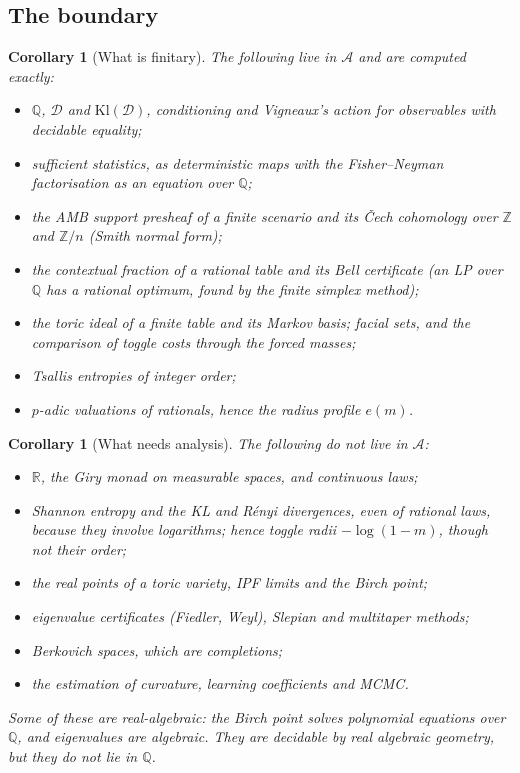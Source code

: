 \documentclass[11pt]{article}
\newtheorem{corollary}[theorem]{Corollary}
\theoremstyle{definition}
\theoremstyle{remark}
\begin{document}
\subsection*{The boundary}
\begin{corollary}[What is finitary]\label{cor:finitary}
The following live in $\mathcal A$ and are computed exactly:
\begin{itemize}
  \item $\mathbb Q$, $\mathcal D$ and $\mathrm{Kl}(\mathcal D)$, conditioning and Vigneaux's action for observables with decidable equality;
  \item sufficient statistics, as deterministic maps with the Fisher--Neyman factorisation as an equation over $\mathbb Q$;
  \item the AMB support presheaf of a finite scenario and its \v{C}ech cohomology over $\mathbb Z$ and $\mathbb Z/n$ (Smith normal form);
  \item the contextual fraction of a \emph{rational} table and its Bell certificate (an LP over $\mathbb Q$ has a rational optimum, found by the finite simplex method);
  \item the toric ideal of a finite table and its Markov basis; facial sets, and the comparison of toggle costs through the forced masses;
  \item Tsallis entropies of integer order;
  \item $p$-adic valuations of rationals, hence the radius profile $e(m)$.
\end{itemize}
\end{corollary}

\begin{corollary}[What needs analysis]\label{cor:analytic}
The following do not live in $\mathcal A$:
\begin{itemize}
  \item $\mathbb R$, the Giry monad on measurable spaces, and continuous laws;
  \item Shannon entropy and the KL and R\'enyi divergences, even of rational laws, because they involve logarithms; hence toggle \emph{radii} $-\log(1-m)$, though not their order;
  \item the real points of a toric variety, IPF limits and the Birch point;
  \item eigenvalue certificates (Fiedler, Weyl), Slepian and multitaper methods;
  \item Berkovich spaces, which are completions;
  \item the estimation of curvature, learning coefficients and MCMC.
\end{itemize}
Some of these are real-algebraic: the Birch point solves polynomial equations over $\mathbb Q$, and eigenvalues are algebraic. They are decidable by real algebraic geometry, but they do not lie in $\mathbb Q$.
\end{corollary}
\end{document}
